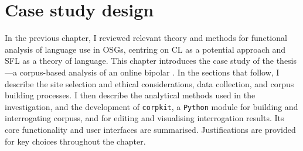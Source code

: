 
\chapter{Case study design} \label{chap:researchdesign}

In the previous chapter, I reviewed relevant theory and methods for functional analysis of language use in \glspl{OSG}, centring on \gls{CL} as a potential approach and \gls{SFL} as a theory of language. This chapter introduces the case study of the thesis---a \gls{corpus}\hyp{}based analysis of an online \gls{bipolar} . In the sections that follow, I describe the site selection and ethical considerations, data collection, and \gls{corpus} building processes. I then describe the analytical methods used in the investigation, and the development of \texttt{corpkit}, a \texttt{Python} module for building and interrogating \glspl{corpus}, and for editing and visualising interrogation results. Its core functionality and user interfaces are summarised. Justifications are provided for key choices throughout the chapter.



